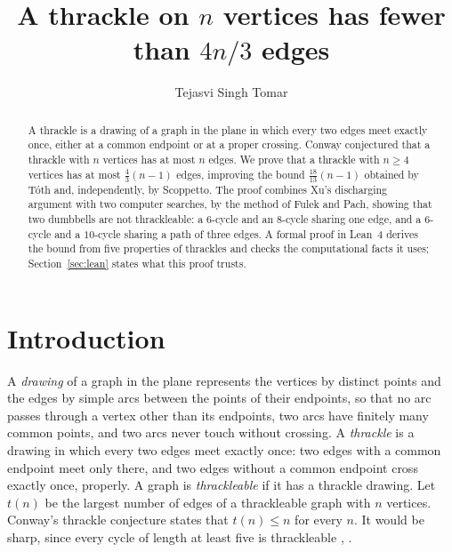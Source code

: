 \documentclass[11pt]{amsart}
\theoremstyle{definition}
\theoremstyle{remark}
\numberwithin{equation}{section}
\newcommand{\cc}{\frac43}\newcommand{\ccs}{4/3}\newcommand{\ccdec}{1.3333\ldots}
\newcommand{\ttitle}{A thrackle on $n$ vertices has fewer than $4n/3$ edges}
\newcommand{\rtitle}{Thrackles have fewer than $4n/3$ edges}
\begin{document}
\title[\rtitle]{\ttitle}
\author{Tejasvi Singh Tomar}
\renewcommand{\urladdrname}{{\itshape ORCID}}

\begin{abstract}
A thrackle is a drawing of a graph in the plane in which every two edges meet exactly once, either at a common endpoint or at a proper crossing. Conway conjectured that a thrackle with $n$ vertices has at most $n$ edges. We prove that a thrackle with $n\ge4$ vertices has at most $\cc(n-1)$ edges, improving the bound $\frac{18}{13}(n-1)$ obtained by T\'oth and, independently, by Scoppetto. The proof combines Xu's discharging argument with two computer searches, by the method of Fulek and Pach, showing that two dumbbells are not thrackleable: a $6$-cycle and an $8$-cycle sharing one edge, and a $6$-cycle and a $10$-cycle sharing a path of three edges. A formal proof in Lean~4 derives the bound from five properties of thrackles and checks the computational facts it uses; Section~\ref{sec:lean} states what this proof trusts.
\end{abstract}

\maketitle

\section{Introduction}\label{sec:intro}

A \emph{drawing} of a graph in the plane represents the vertices by distinct points and the edges by simple arcs between the points of their endpoints, so that no arc passes through a vertex other than its endpoints, two arcs have finitely many common points, and two arcs never touch without crossing. A \emph{thrackle} is a drawing in which every two edges meet exactly once: two edges with a common endpoint meet only there, and two edges without a common endpoint cross exactly once, properly. A graph is \emph{thrackleable} if it has a thrackle drawing. Let $t(n)$ be the largest number of edges of a thrackleable graph with $n$ vertices. Conway's thrackle conjecture states that $t(n)\le n$ for every $n$. It would be sharp, since every cycle of length at least five is thrackleable \cite{Woo71}, \cite[Section~1]{FP11}.
\end{document}
